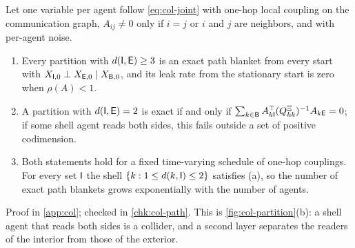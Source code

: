 \begin{proposition}\label{prop:col-two-hop}
Let one variable per agent follow \eqref{eq:col-joint} with one-hop local coupling on the communication graph, $A_{ij}\neq0$ only if $i=j$ or $i$ and $j$ are neighbors, and with per-agent noise.
\begin{enumerate}
\item[(a)] Every partition with $d(\mathsf{I},\mathsf{E})\ge3$ is an exact path blanket from every start with $X_{\mathsf{I},0}\perp X_{\mathsf{E},0}\mid X_{\mathsf{B},0}$, and its leak rate from the stationary start is zero when $\rho(A)<1$.
\item[(b)] A partition with $d(\mathsf{I},\mathsf{E})=2$ is exact if and only if $\sum_{k\in\mathsf{B}}A_{k\mathsf{I}}^\top(Q^{\Xi}_{kk})^{-1}A_{k\mathsf{E}}=0$; if some shell agent reads both sides, this fails outside a set of positive codimension.
\item[(c)] Both statements hold for a fixed time-varying schedule of one-hop couplings. For every set $\mathsf{I}$ the shell $\{k:1\le d(k,\mathsf{I})\le2\}$ satisfies (a), so the number of exact path blankets grows exponentially with the number of agents.
\end{enumerate}
\end{proposition}
Proof in \cref{app:col}; checked in \cref{chk:col-path}. This is \cref{fig:col-partition}(b): a shell agent that reads both sides is a collider, and a second layer separates the readers of the interior from those of the exterior.

